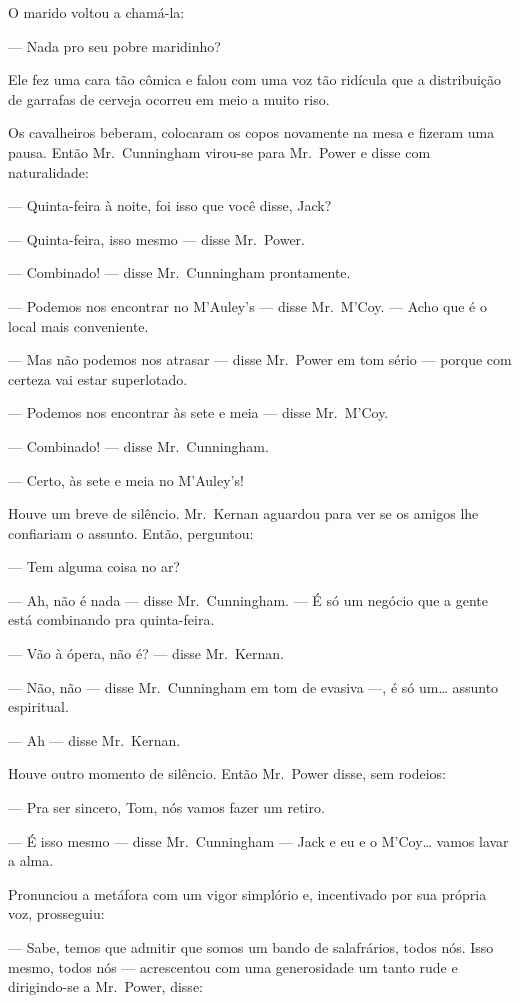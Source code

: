 O marido voltou a chamá-la:

--- Nada pro seu pobre maridinho?

Ele fez uma cara tão cômica e falou com uma voz tão ridícula que a distribuição
de garrafas de cerveja ocorreu em meio a muito riso.

Os cavalheiros beberam, colocaram os copos novamente na mesa e fizeram uma
pausa.  Então Mr.~Cunningham virou-se para Mr.~Power e disse com naturalidade:

--- Quinta-feira à noite, foi isso que você disse, Jack?

--- Quinta-feira, isso mesmo --- disse Mr.~Power.

--- Combinado! --- disse Mr.~Cunningham prontamente.

--- Podemos nos encontrar no M’Auley’s --- disse Mr.~M’Coy.  --- Acho que é o
local mais conveniente.

--- Mas não podemos nos atrasar --- disse Mr.~Power em tom sério --- porque com
certeza vai estar superlotado.

--- Podemos nos encontrar às sete e meia --- disse Mr.~M’Coy.

--- Combinado! --- disse Mr.~Cunningham.

--- Certo, às sete e meia no M’Auley’s!

Houve um breve de silêncio.  Mr.~Kernan aguardou para ver se os amigos lhe
confiariam o assunto.  Então, perguntou:

--- Tem alguma coisa no ar?

--- Ah, não é nada --- disse Mr.~Cunningham.  --- É só um negócio que a gente
está combinando pra quinta-feira.

--- Vão à ópera, não é? --- disse Mr.~Kernan.

--- Não, não --- disse Mr.~Cunningham em tom de evasiva ---, é só um\ldots{}
assunto espiritual.

--- Ah --- disse Mr.~Kernan.

Houve outro momento de silêncio.  Então Mr.~Power disse, sem rodeios:

--- Pra ser sincero, Tom, nós vamos fazer um retiro.

--- É isso mesmo --- disse Mr.~Cunningham --- Jack e eu e o M’Coy\ldots{} vamos
lavar a alma.

Pronunciou a metáfora com um vigor simplório e, incentivado por sua própria
voz, prosseguiu:

--- Sabe, temos que admitir que somos um bando de salafrários, todos nós.  Isso
mesmo, todos nós --- acrescentou com uma generosidade um tanto rude e
dirigindo-se a Mr.~Power, disse:

